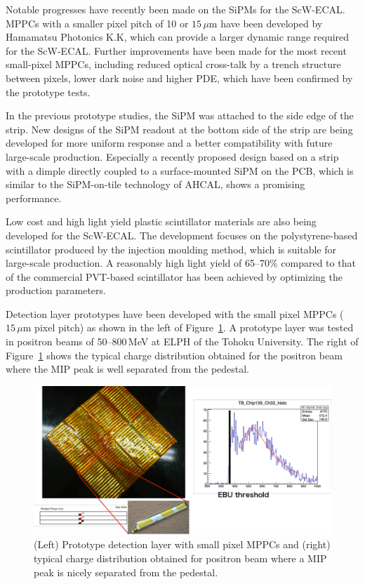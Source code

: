 Notable progresses have recently been made on the SiPMs for the ScW-ECAL. 
MPPCs with a smaller pixel pitch of 10 or $15\,\mu\mathrm{m}$ have been developed 
by Hamamatsu Photonics K.K, which can provide a larger dynamic range required 
for the ScW-ECAL\cite{ild:bib:hdmppc}. 
Further improvements have been made for the most recent small-pixel MPPCs, 
including reduced optical cross-talk by a trench structure between pixels, 
lower dark noise and higher PDE, which have been confirmed by the prototype tests.

In the previous prototype studies, the SiPM was attached to the side edge 
of the strip. 
New designs of the SiPM readout at the bottom side of the strip 
are being developed for more uniform response and a better compatibility 
with future large-scale production.
Especially a recently proposed design based on a strip 
with a dimple directly coupled to a surface-mounted SiPM on the PCB, 
which is similar to the SiPM-on-tile technology of AHCAL,
shows a promising performance.

Low cost and high light yield plastic scintillator materials are also being developed 
for the ScW-ECAL.
The development focuses on the polystyrene-based scintillator 
produced by the injection moulding method, which is suitable 
for large-scale production. 
A reasonably high light yield of 65--70\% compared to that of 
the commercial PVT-based scintillator has been achieved 
by optimizing the production parameters. 

Detection layer prototypes have been developed 
with the small pixel MPPCs ($15\,\mu\mathrm{m}$ pixel pitch) 
as shown in the left of Figure~\ref{fig:det:ScWECAL_prototype}.
A prototype layer was tested in positron beams of 50--800\,MeV 
at ELPH of the Tohoku University.
The right of Figure~\ref{fig:det:ScWECAL_prototype} shows the typical charge distribution 
obtained for the positron beam where the MIP peak is well separated 
from the pedestal.

\begin{figure}[t!]
\centering
\includegraphics[width=1.0\hsize]{Detector/fig/ScWECAL_prototype.pdf}
\caption{(Left) Prototype detection layer with small pixel MPPCs  
   and (right) typical charge distribution obtained for positron beam 
where a MIP peak is nicely separated from the pedestal.}
\label{fig:det:ScWECAL_prototype}
\end{figure}


